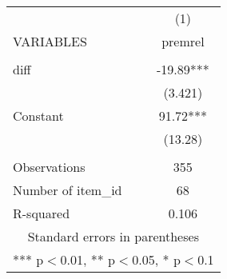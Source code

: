 \documentclass[]{article}
\begin{document}
\begin{tabular}{lc} \hline
 & (1) \\
VARIABLES & premrel \\ \hline
 &  \\
diff & -19.89*** \\
 & (3.421) \\
Constant & 91.72*** \\
 & (13.28) \\
 &  \\
Observations & 355 \\
Number of item\_id & 68 \\
 R-squared & 0.106 \\ \hline
\multicolumn{2}{c}{ Standard errors in parentheses} \\
\multicolumn{2}{c}{ *** p$<$0.01, ** p$<$0.05, * p$<$0.1} \\
\end{tabular}
\end{document}
